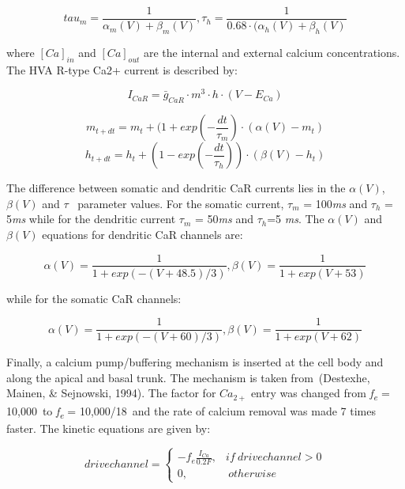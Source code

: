 \documentclass[12pt]{article}
\begin{document}
\begin{equation}
tau_m=\frac {1}{\alpha_m(V)+\beta_m(V)}, \tau_h=\frac {1}{0.68\cdot (\alpha_h(V)+\beta_h(V)}
\end{equation}

where
$[Ca]_{in}$ and $[Ca]_{out}$ are the
internal and external calcium concentrations. The HVA R-type Ca2+ current is described by:


\begin{equation}
I_{CaR}=\bar g_{CaR}\cdot m^3\cdot h\cdot
(V-E_{Ca})
\end{equation}

\begin{equation}
m_{t+dt}=m_t+(1+exp(-\frac{dt}{\tau_m})\cdot (\alpha(V)-m_t)
\end{equation}
\begin{equation}
h_{t+dt}=h_t+(1-exp(-\frac{dt}{\tau_h}))\cdot (\beta(V) - h_t)
\end{equation}

The difference between somatic and dendritic CaR currents lies in the $\alpha(V)$, $\beta(V)$ and $\tau$ ~parameter
values. For the somatic current, $\tau_m$ = 100\textit{ms} and
$\tau_h$ = 5\textit{ms} while for the dendritic current $\tau_m$ = 50\textit{ms} and $\tau_h$=5 \textit{ ms}. The $\alpha(V)$ and $\beta(V)$ equations for dendritic CaR channels are:


\begin{equation}
\alpha(V)=\frac {1}{1+exp(-(V+48.5)/3)},\beta(V)=\frac {1}{1+exp(V+53)}
\end{equation}

while for the somatic CaR channels:


\begin{equation}
\alpha(V)=\frac {1}{1+exp(-(V+60)/3)},\beta(V)=\frac {1}{1+exp(V+62)}
\end{equation}

Finally, a calcium pump/buffering mechanism is inserted at the cell body and along the apical and basal trunk. The
mechanism is taken from~(Destexhe, Mainen, \& Sejnowski, 1994). The factor for
$Ca_{2+}$ entry was changed from
\textit{f}\textit{\textsubscript{e}}\textit{ }=\textit{ }10,000~to \textit{f}\textit{\textsubscript{e}}\textit{
}=\textit{ }10,000/18~and the rate of calcium removal was made 7 times faster. The kinetic equations are given by:

\begin{equation}
drivechannel = \begin{cases} -f_e \frac{I_{Ca}}{0.2 F}, & if \ drivechannel > 0  \\ 0, & \  otherwise \ \end{cases}
\end{equation}
\end{document}
